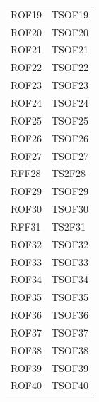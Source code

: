 \documentclass[../PianoDiQualifica_v4.0.0.tex]{subfiles}
\begin{document}
\begin{longtable}[c] { >{\centering\arraybackslash}p{3cm} >{\centering\arraybackslash}p{3cm}}
			\midrule
			\addlinespace[0.3em]
			ROF19 & TSOF19 \\
			\addlinespace[0.3em]
			\midrule
			\addlinespace[0.3em]
			ROF20 & TSOF20 \\
			\addlinespace[0.3em]
			\midrule
			\addlinespace[0.3em]
			ROF21 & TSOF21 \\
			\addlinespace[0.3em]
			\midrule
			\addlinespace[0.3em]
			ROF22 & TSOF22 \\
			\addlinespace[0.3em]
			\midrule
			\addlinespace[0.3em]
			ROF23 & TSOF23 \\
			\addlinespace[0.3em]
			\midrule
			\addlinespace[0.3em]
			ROF24 & TSOF24 \\
			\addlinespace[0.3em]
			\midrule
			\addlinespace[0.3em]
			ROF25 & TSOF25 \\
			\addlinespace[0.3em]
			\midrule
			\addlinespace[0.3em]
			ROF26 & TSOF26 \\
			\addlinespace[0.3em]
			\midrule
			\addlinespace[0.3em]
			ROF27 & TSOF27 \\
			\addlinespace[0.3em]
			\midrule
			\addlinespace[0.3em]
			RFF28 & TS2F28 \\
			\addlinespace[0.3em]
			\midrule
			\addlinespace[0.3em]
			ROF29 & TSOF29 \\
			\addlinespace[0.3em]
			\midrule
			\addlinespace[0.3em]
			ROF30 & TSOF30 \\
			\addlinespace[0.3em]
			\midrule
			\addlinespace[0.3em]
			RFF31 & TS2F31 \\
			\addlinespace[0.3em]
			\midrule
			\addlinespace[0.3em]
			ROF32 & TSOF32 \\
			\addlinespace[0.3em]
			\midrule
			\addlinespace[0.3em]
			ROF33 & TSOF33 \\
			\addlinespace[0.3em]
			\midrule
			\addlinespace[0.3em]
			ROF34 & TSOF34 \\
			\addlinespace[0.3em]
			\midrule
			\addlinespace[0.3em]
			ROF35 & TSOF35 \\
			\addlinespace[0.3em]
			\midrule
			\addlinespace[0.3em]
			ROF36 & TSOF36 \\
			\addlinespace[0.3em]
			\midrule
			\addlinespace[0.3em]
			ROF37 & TSOF37 \\
			\addlinespace[0.3em]
			\midrule
			\addlinespace[0.3em]
			ROF38 & TSOF38 \\
			\addlinespace[0.3em]
			\midrule
			\addlinespace[0.3em]
			ROF39 & TSOF39 \\
			\addlinespace[0.3em]
			\midrule
			\addlinespace[0.3em]
			ROF40 & TSOF40 \\

\end{longtable}
\end{document}
